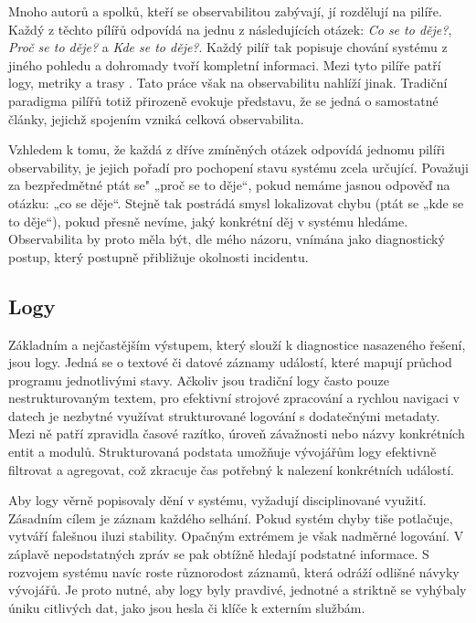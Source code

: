 \documentclass[FM,DP,fonts]{tulthesis}
\begin{document}
Mnoho autorů a spolků, kteří se observabilitou zabývají, jí rozdělují na pilíře. Každý z těchto pílířů odpovídá na jednu z následujících otázek: \textit{Co se to děje?}, \textit{Proč se to děje?} a \textit{Kde se to děje?}. Každý pilíř tak popisuje chování systému z jiného pohledu a dohromady tvoří kompletní informaci. Mezi tyto pilíře patří logy, metriky a trasy \parencite{elastic-observability}. Tato práce však na observabilitu nahlíží jinak. Tradiční paradigma pilířů totiž přirozeně evokuje představu, že se jedná o samostatné články, jejichž spojením vzniká celková observabilita.

Vzhledem k tomu, že každá z dříve zmíněných otázek odpovídá jednomu pilíři observability, je jejich pořadí pro pochopení stavu systému zcela určující. Považuji za bezpředmětné ptát se" „proč se to děje“, pokud nemáme jasnou odpověď na otázku: „co se děje“. Stejně tak postrádá smysl lokalizovat chybu (ptát se „kde se to děje“), pokud přesně nevíme, jaký konkrétní děj v systému hledáme. Observabilita by proto měla být, dle mého názoru, vnímána jako diagnostický postup, který postupně přibližuje okolnosti incidentu.

\subsection{Logy}
Základním a nejčastějším výstupem, který slouží k diagnostice nasazeného řešení, jsou logy. Jedná se o textové či datové záznamy událostí, které mapují průchod programu jednotlivými stavy. Ačkoliv jsou tradiční logy často pouze nestrukturovaným textem, pro efektivní strojové zpracování a rychlou navigaci v datech je nezbytné využívat strukturované logování s dodatečnými metadaty. Mezi ně patří zpravidla časové razítko, úroveň závažnosti nebo názvy konkrétních entit a modulů. Strukturovaná podstata umožňuje vývojářům logy efektivně filtrovat a agregovat, což zkracuje čas potřebný k nalezení konkrétních událostí.

Aby logy věrně popisovaly dění v systému, vyžadují disciplinované využití. Zásadním cílem je záznam každého selhání. Pokud systém chyby tiše potlačuje, vytváří falešnou iluzi stability. Opačným extrémem je však nadměrné logování. V záplavě nepodstatných zpráv se pak obtížně hledají podstatné informace. S rozvojem systému navíc roste různorodost záznamů, která odráží odlišné návyky vývojářů. Je proto nutné, aby logy byly pravdivé, jednotné a striktně se vyhýbaly úniku citlivých dat, jako jsou hesla či klíče k externím službám. \parencite{gu2022logging}
\end{document}
